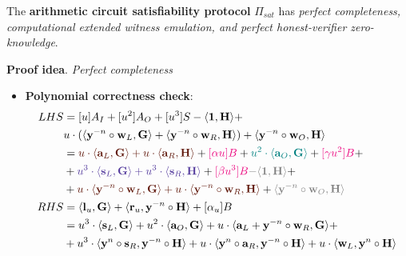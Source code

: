 \documentclass[../lecture-notes-148x210.tex]{subfiles}
\begin{document}
\begin{theorem}
    The \textbf{arithmetic circuit satisfiability protocol} $\Pi_{sat}$ has \textit{perfect completeness, computational extended witness emulation, and perfect honest-verifier zero-knowledge}.
    \label{th:arithmetic_circuit_satisfiability}
\end{theorem}
\textbf{Proof idea}. \textit{Perfect completeness} 
\begin{itemize}
    \item \textbf{Polynomial correctness check}:
    \begin{equation*}
        \begin{aligned}
            LHS &= [u]A_I + [u^2]A_O + [u^3]S - \langle \mathbf{1}, \mathbf{H} \rangle +\\
            &u \cdot (\langle \mathbf{y}^{-n} \circ \mathbf{w}_L, \mathbf{G} \rangle + \langle \mathbf{y}^{-n} \circ \mathbf{w}_R, \mathbf{H} \rangle) + \langle \mathbf{y}^{-n} \circ \mathbf{w}_O, \mathbf{H} \rangle \\
            &= \textcolor{Sepia}{u \cdot \langle \mathbf{a}_L, \mathbf{G} \rangle + u \cdot \langle \mathbf{a}_R, \mathbf{H} \rangle} + \textcolor{RubineRed}{[\alpha u]B} + \textcolor{teal}{u^2 \cdot \langle \mathbf{a}_O, \mathbf{G} \rangle} + \textcolor{RubineRed}{[\gamma u^2]B} + \\
            &+ \textcolor{Violet}{u^3 \cdot \langle \mathbf{s}_L, \mathbf{G} \rangle + u^3 \cdot \langle \mathbf{s}_R, \mathbf{H} \rangle} + \textcolor{RubineRed}{[\beta u^3]B} \textcolor{gray}{- \langle \mathbf{1}, \mathbf{H} \rangle} + \\
            &+ \textcolor{Sepia}{u \cdot \langle \mathbf{y}^{-n} \circ \mathbf{w}_L, \mathbf{G} \rangle + u\cdot \langle \mathbf{y}^{-n} \circ \mathbf{w}_R, \mathbf{H} \rangle} + \textcolor{gray}{\langle \mathbf{y}^{-n} \circ \mathbf{w}_O, \mathbf{H} \rangle} \\
            RHS &= \langle \mathbf{l}_u, \mathbf{G} \rangle + \langle \mathbf{r}_u, \mathbf{y}^{-n} \circ \mathbf{H} \rangle + [\alpha_u]B \\
            &= u^3 \cdot \langle \mathbf{s}_L, \mathbf{G} \rangle + u^2 \cdot \langle \mathbf{a}_O, \mathbf{G} \rangle + u \cdot \langle \mathbf{a}_L + \mathbf{y}^{-n} \circ \mathbf{w}_R, \mathbf{G} \rangle + \\
            &+ u^3 \cdot \langle \mathbf{y}^n \circ \mathbf{s}_R, \mathbf{y}^{-n} \circ \mathbf{H} \rangle + u \cdot \langle \mathbf{y}^n \circ \mathbf{a}_R, \mathbf{y}^{-n} \circ \mathbf{H} \rangle + u \cdot \langle \mathbf{w}_L, \mathbf{y}^n \circ \mathbf{H} \rangle \\

\end{aligned}
\end{equation*}
\end{itemize}
\end{document}
